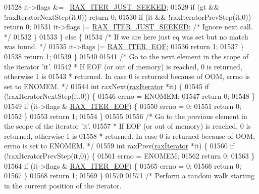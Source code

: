 \begin{DoxyCode}
{{{{{{{{{{{{{{{{{{{{{{{{01528             it->flags &= ~\hyperlink{rax_8h_a665a029bbb4c6864ca2153b3ba3b746c}{RAX\_ITER\_JUST\_SEEKED};
01529             \textcolor{keywordflow}{if} (gt && !raxIteratorNextStep(it,0)) \textcolor{keywordflow}{return} 0;
01530             \textcolor{keywordflow}{if} (lt && !raxIteratorPrevStep(it,0)) \textcolor{keywordflow}{return} 0;
01531             it->flags |= \hyperlink{rax_8h_a665a029bbb4c6864ca2153b3ba3b746c}{RAX\_ITER\_JUST\_SEEKED}; \textcolor{comment}{/* Ignore next call. */}
01532         \}
01533     \} \textcolor{keywordflow}{else} \{
01534         \textcolor{comment}{/* If we are here just eq was set but no match was found. */}
01535         it->flags |= \hyperlink{rax_8h_a4fb08a914b84ba0a39daa86297176e1c}{RAX\_ITER\_EOF};
01536         \textcolor{keywordflow}{return} 1;
01537     \}
01538     \textcolor{keywordflow}{return} 1;
01539 \}
01540 
01541 \textcolor{comment}{/* Go to the next element in the scope of the iterator 'it'.}
01542 \textcolor{comment}{ * If EOF (or out of memory) is reached, 0 is returned, otherwise 1 is}
01543 \textcolor{comment}{ * returned. In case 0 is returned because of OOM, errno is set to ENOMEM. */}
01544 \textcolor{keywordtype}{int} raxNext(\hyperlink{structraxIterator}{raxIterator} *it) \{
01545     \textcolor{keywordflow}{if} (!raxIteratorNextStep(it,0)) \{
01546         errno = ENOMEM;
01547         \textcolor{keywordflow}{return} 0;
01548     \}
01549     \textcolor{keywordflow}{if} (it->flags & \hyperlink{rax_8h_a4fb08a914b84ba0a39daa86297176e1c}{RAX\_ITER\_EOF}) \{
01550         errno = 0;
01551         \textcolor{keywordflow}{return} 0;
01552     \}
01553     \textcolor{keywordflow}{return} 1;
01554 \}
01555 
01556 \textcolor{comment}{/* Go to the previous element in the scope of the iterator 'it'.}
01557 \textcolor{comment}{ * If EOF (or out of memory) is reached, 0 is returned, otherwise 1 is}
01558 \textcolor{comment}{ * returned. In case 0 is returned because of OOM, errno is set to ENOMEM. */}
01559 \textcolor{keywordtype}{int} raxPrev(\hyperlink{structraxIterator}{raxIterator} *it) \{
01560     \textcolor{keywordflow}{if} (!raxIteratorPrevStep(it,0)) \{
01561         errno = ENOMEM;
01562         \textcolor{keywordflow}{return} 0;
01563     \}
01564     \textcolor{keywordflow}{if} (it->flags & \hyperlink{rax_8h_a4fb08a914b84ba0a39daa86297176e1c}{RAX\_ITER\_EOF}) \{
01565         errno = 0;
01566         \textcolor{keywordflow}{return} 0;
01567     \}
01568     \textcolor{keywordflow}{return} 1;
01569 \}
01570 
01571 \textcolor{comment}{/* Perform a random walk starting in the current position of the iterator.}
}}}}}}}}}}}}}}}}}}}}}}}}
\end{DoxyCode}
